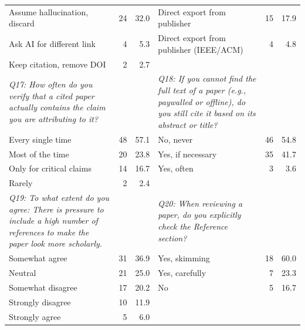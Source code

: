 \begin{table}[htbp]
\begin{tabular}{p{6cm}rr|p{6cm}rr}
Assume hallucination, discard & 24 & 32.0 & Direct export from publisher & 15 & 17.9 \\
\rowcolor{tableRowLight}
Ask AI for different link & 4 & 5.3 & Direct export from publisher (IEEE/ACM) & 4 & 4.8 \\
\rowcolor{tableRowLight}
Keep citation, remove DOI & 2 & 2.7 &  &  &  \\
\midrule
\textit{Q17: How often do you verify that a cited paper actually contains the claim you are attributing to it?} & & & \textit{Q18: If you cannot find the full text of a paper (e.g., paywalled or offline), do you still cite it based on its abstract or title?} & & \\
\rowcolor{tableRowLight}
Every single time & 48 & 57.1 & No, never & 46 & 54.8 \\
Most of the time & 20 & 23.8 & Yes, if necessary & 35 & 41.7 \\
\rowcolor{tableRowLight}
Only for critical claims & 14 & 16.7 & Yes, often & 3 & 3.6 \\
Rarely & 2 & 2.4 &  &  &  \\
\midrule
\textit{Q19: To what extent do you agree: There is pressure to include a high number of references to make the paper look more scholarly.} & & & \textit{Q20: When reviewing a paper, do you explicitly check the Reference section?} & & \\
\rowcolor{tableRowLight}
Somewhat agree & 31 & 36.9 & Yes, skimming & 18 & 60.0 \\
Neutral & 21 & 25.0 & Yes, carefully & 7 & 23.3 \\
\rowcolor{tableRowLight}
Somewhat disagree & 17 & 20.2 & No & 5 & 16.7 \\
Strongly disagree & 10 & 11.9 &  &  &  \\
\rowcolor{tableRowLight}
Strongly agree & 5 & 6.0 &  &  &  \\
\bottomrule
\end{tabular}
\end{table}

